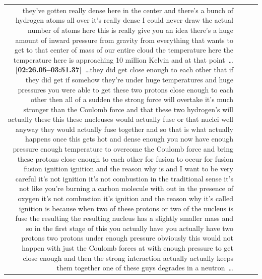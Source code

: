 \documentclass[10pt]{article}
\begin{document}
\begin{tiny}
\begin{longtable}{r p{0.3in} p{1.212in} p{3.8in}}
they've gotten really dense here in the center and there's a bunch of hydrogen atoms all over it's really dense I could never draw the actual number of atoms here this is really give you an idea there's a huge amount of inward pressure from gravity from everything that wants to get to that center of mass of our entire cloud the temperature here the temperature here is approaching 10 million Kelvin and at that point~\ldots\smallskip\newline\textbf{[02:26.05--03:51.37]}~\ldots they did get close enough to each other that if they did get if somehow they're under huge temperatures and huge pressures you were able to get these two protons close enough to each other then all of a sudden the strong force will overtake it's much stronger than the Coulomb force and that these two hydrogen's will actually these this these nucleuses would actually fuse or that nuclei well anyway they would actually fuse together and so that is what actually happens once this gets hot and dense enough you now have enough pressure enough temperature to overcome the Coulomb force and bring these protons close enough to each other for fusion to occur for fusion fusion ignition ignition and the reason why is and I want to be very careful it's not ignition it's not combustion in the traditional sense it's not like you're burning a carbon molecule with out in the presence of oxygen it's not combustion it's ignition and the reason why it's called ignition is because when two of these protons or two of the nucleus is fuse the resulting the resulting nucleus has a slightly smaller mass and so in the first stage of this you actually have you actually have two protons two protons under enough pressure obviously this would not happen with just the Coulomb forces at with enough pressure to get close enough and then the strong interaction actually actually keeps them together one of these guys degrades in a neutron~\ldots \\

\end{longtable}
\end{tiny}
\end{document}
